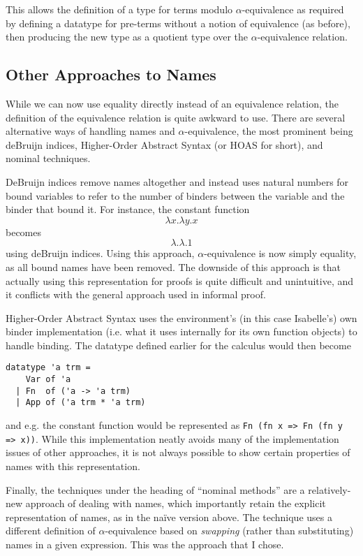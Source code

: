 This allows the definition of a type for terms modulo \(\alpha\)-equivalence as required by defining a datatype for pre-terms without a notion of equivalence (as before), then producing the new type as a quotient type over the \(\alpha\)-equivalence relation.

\subsection{Other Approaches to Names}
While we can now use equality directly instead of an equivalence relation, the definition of the equivalence relation is quite awkward to use.
There are several alternative ways of handling names and \(\alpha\)-equivalence, the most prominent being deBruijn indices, Higher-Order Abstract Syntax (or HOAS for short), and nominal techniques.

DeBruijn indices remove names altogether and instead uses natural numbers for bound variables to refer to the number of binders between the variable and the binder that bound it.
For instance, the constant function
\[
\lambda x. \lambda y. x
\]
becomes
\[
\lambda.\lambda. 1
\]
using deBruijn indices.
Using this approach, \(\alpha\)-equivalence is now simply equality, as all bound names have been removed.
The downside of this approach is that actually using this representation for proofs is quite difficult and unintuitive, and it conflicts with the general approach used in informal proof.

Higher-Order Abstract Syntax uses the environment's (in this case Isabelle's) own binder implementation (i.e. what it uses internally for its own function objects) to handle binding.
The datatype defined earlier for the calculus would then become
\begin{verbatim}
datatype 'a trm =
    Var of 'a
  | Fn  of ('a -> 'a trm)
  | App of ('a trm * 'a trm)
\end{verbatim}
and e.g. the constant function would be represented as \texttt{Fn (fn x => Fn (fn y => x))}.
While this implementation neatly avoids many of the implementation issues of other approaches, it is not always possible to show certain properties of names with this representation\cite{HOAS}.

Finally, the techniques under the heading of ``nominal methods'' are a relatively-new approach of dealing with names, which importantly retain the explicit representation of names, as in the na\"ive version above.
The technique uses a different definition of \(\alpha\)-equivalence based on \emph{swapping} (rather than substituting) names in a given expression\cite{nominal}.
This was the approach that I chose.

